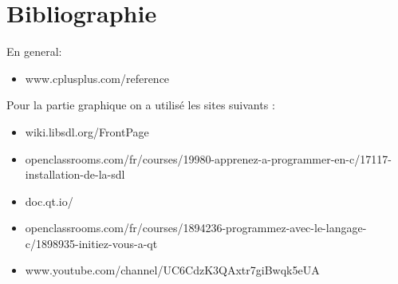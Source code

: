 \documentclass{article}
\begin{document}
\section{Bibliographie}
En general:
\begin{itemize}
\item www.cplusplus.com/reference
\end{itemize}
Pour la partie graphique on a utilisé les sites suivants :
\begin{itemize}
\item wiki.libsdl.org/FrontPage
\item openclassrooms.com/fr/courses/19980-apprenez-a-programmer-en-c/17117-installation-de-la-sdl
\item doc.qt.io/
\item openclassrooms.com/fr/courses/1894236-programmez-avec-le-langage-c/1898935-initiez-vous-a-qt
\item www.youtube.com/channel/UC6CdzK3QAxtr7giBwqk5eUA
\end{itemize}
\end{document}
